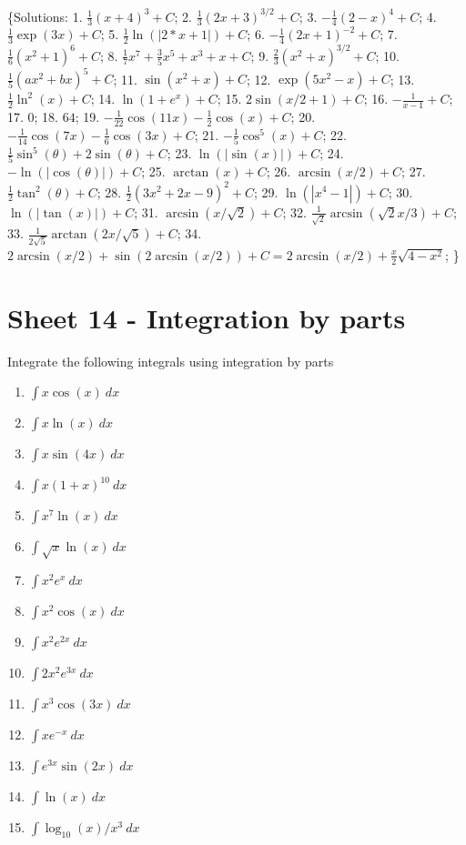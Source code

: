 \documentclass[
  english,
  11pt,
  oneside]{book}
\providecommand{\tightlist}{%
  \setlength{\itemsep}{0pt}\setlength{\parskip}{0pt}}
\newcommand{\slide}{}
\theoremstyle{definition}
\theoremstyle{definition}
\theoremstyle{definition}
\theoremstyle{definition}
\theoremstyle{remark}
\begin{document}
\{Solutions:
1. \(\frac{1}{3}(x+4)^3+C\);
2. \(\frac{1}{3}(2x+3)^{3/2}+C\);
3. \(-\frac{1}{4}(2-x)^4 +C\);
4. \(\frac{1}{3}\exp(3x)+C\);
5. \(\frac{1}{2}\ln(|2*x+1|)+C\);
6. \(-\frac{1}{4}(2x+1)^{-2}+C\);
7. \(\frac{1}{6}(x^2+1)^6+C\);
8. \(\frac{1}{7}x^7+\frac{3}{5}x^5+x^3+x+C\);
9. \(\frac{2}{3}(x^2+x)^{3/2}+C\);
10. \(\frac{1}{5}(ax^2+bx)^{5}+C\);
11. \(\sin(x^2+x)+C\);
12. \(\exp(5x^2-x)+C\);
13. \(\frac{1}{2}\ln^2(x)+C\);
14. \(\ln(1+e^x)+C\);
15. \(2\sin(x/2+1)+C\);
16. \(-\frac{1}{x-1}+C\);
17. \(0\);
18. \(64\);
19. \(-\frac{1}{22}\cos(11x)-\frac{1}{2}\cos(x)+C\);
20. \(-\frac{1}{14}\cos(7x)-\frac{1}{6}\cos(3x)+C\);
21. \(-\frac{1}{5}\cos^5(x)+C\);
22. \(\frac{1}{5}\sin^5(\theta)+2\sin(\theta)+C\);
23. \(\ln(|\sin(x)|)+C\);
24. \(-\ln(|\cos(\theta)|)+C\);
25. \(\arctan(x)+C\);
26. \(\arcsin(x/2)+C\);
27. \(\frac{1}{2}\tan^2(\theta)+C\);
28. \(\frac{1}{2}(3x^2+2x-9)^2+C\);
29. \(\ln(|x^4-1|)+C\);
30. \(\ln(|\tan(x)|)+C\);
31. \(\arcsin(x/\sqrt{2})+C\);
32. \(\frac{1}{\sqrt{2}}\arcsin(\sqrt{2}x/3) +C\);
33. \(\frac{1}{2\sqrt{5}}\arctan(2x/\sqrt{5}) +C\);
34. \(2\arcsin(x/2) + \sin\left(2\arcsin(x/2)\right) +C = 2\arcsin(x/2)+\frac{x}{2}\sqrt{4-x^2}\);
\}

\slide

\section{Sheet 14 - Integration by parts}\label{sheet-14---integration-by-parts}

Integrate the following integrals using integration by parts

\begin{enumerate}
\def\labelenumi{\arabic{enumi}.}
\tightlist
\item
  \(\int x\cos(x)\ dx\)
\item
  \(\int x\ln(x)\ dx\)
\item
  \(\int x\sin(4x)\ dx\)
\item
  \(\int x(1+x)^{10}\ dx\)
\item
  \(\int x^7\ln(x)\ dx\)
\item
  \(\int \sqrt{x}\ln(x)\ dx\)
\item
  \(\int x^2e^x\ dx\)
\item
  \(\int x^2\cos(x)\ dx\)
\item
  \(\int x^2e^{2x}\ dx\)
\item
  \(\int 2x^2e^{3x}\ dx\)
\item
  \(\int x^3\cos(3x)\ dx\)
\item
  \(\int xe^{-x}\ dx\)
\item
  \(\int e^{3x}\sin(2x)\ dx\)
\item
  \(\int \ln(x)\ dx\)
\item
  \(\int \log_{10}(x)/x^3\ dx\)
\end{enumerate}
\end{document}
